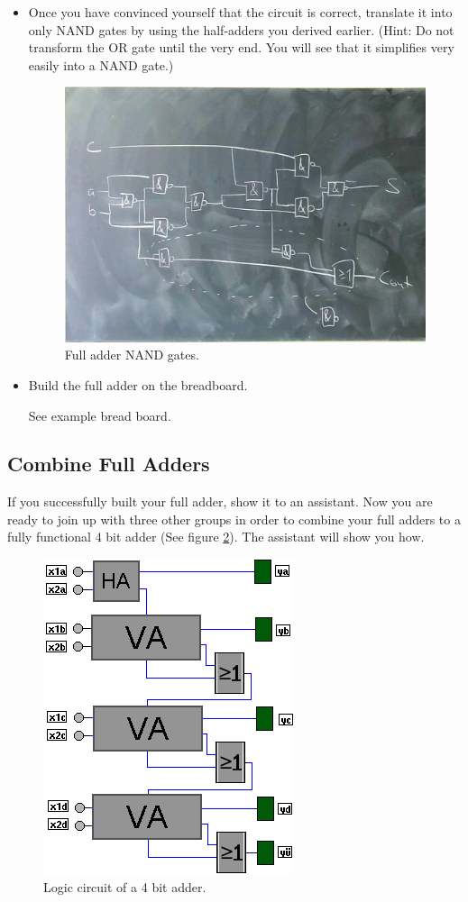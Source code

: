 \documentclass[10pt,a4paper]{article}
\begin{document}
\begin{itemize}
		\item Once you have convinced yourself that the circuit is correct, translate it into only NAND gates by using the half-adders you derived earlier. (Hint: Do not transform the OR gate until the very end. You will see that it simplifies very easily into a NAND gate.)
		\begin{figure}[H]
			\centering		  
			\includegraphics[scale=0.3]{full_nand_adder}
			\caption{Full adder NAND gates.}
			\label{fig:full-adder}
		\end{figure}
		\item Build the full adder on the breadboard.
		\begin{center}
			See example bread board.
		\end{center}
	\end{itemize}

\subsection{Combine Full Adders}
If you successfully built your full adder, show it to an assistant. Now you are ready to join up with three other groups in order to combine your full adders to a fully functional 4 bit adder (See figure \ref{fig:4bit}). The assistant will show you how.
\begin{figure}[H]
	\centering		  
	\includegraphics[scale=0.5]{4bit}
	\caption{Logic circuit of a 4 bit adder.}
	\label{fig:4bit}
\end{figure}
\end{document}
